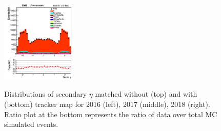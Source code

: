\documentclass{cernatlasnote}
\begin{document}
\begin{figure}[htp]
 \includegraphics[width=0.32\textwidth]{images/emu_channel/2018/18_Range_0pt7_1pt3/SecInt_eta_TrackerMatched_Linear.png}\\
 \caption{Distributions of secondary $\eta$ matched without (top) and with (bottom) tracker map for 2016 (left), 2017 (middle), 2018 (right). Ratio plot at the bottom represents the ratio of data over total MC simulated events.}
 \label{fig:L0DATAMC}
  \end{figure}
\end{document}
